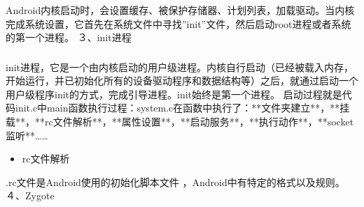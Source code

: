 \documentclass[9pt, b5paper]{article}
\begin{document}
\subsubsection{}
\label{sec-5-0-2}
Android内核启动时，会设置缓存、被保护存储器、计划列表，加载驱动。当内核完成系统设置，它首先在系统文件中寻找”init”文件，然后启动root进程或者系统的第一个进程。
 ３、init进程
\subsubsection{}
\label{sec-5-0-3}
init进程，它是一个由内核启动的用户级进程。内核自行启动（已经被载入内存，开始运行，并已初始化所有的设备驱动程序和数据结构等）之后，就通过启动一个用户级程序init的方式，完成引导进程。init始终是第一个进程。
启动过程就是代码init.c中main函数执行过程：system\core\init\init.c在函数中执行了：**文件夹建立**，**挂载**，**rc文件解析**，**属性设置**，**启动服务**，**执行动作**，**socket监听**……
\begin{itemize}
\item rc文件解析
\end{itemize}
.rc文件是Android使用的初始化脚本文件 ，Android中有特定的格式以及规则。
 ４、Zygote
\end{document}
